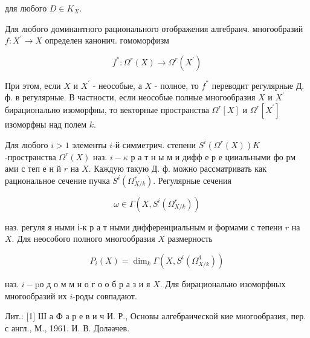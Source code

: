 \documentclass[10pt]{article}
\begin{document}
для любого $D \in K_{X}$.



Для любого доминантного рационального отображения алгебраич. многообразий $f: X^{\prime} \rightarrow X$ определен канонич. гомоморфизм



\[

f^{*}: \Omega^{r}(X) \longrightarrow \Omega^{r}\left(X^{\prime}\right)

\]



При этом, если $X$ и $X^{\prime}$ - неособые, а $X$ - полное, то $f^{*}$ переводит регулярные Д. ф. в регулярные. В частности, если неособые полные многообразия $X$ и $X^{\prime}$ бирационально изоморфны, то векторные пространства $\Omega^{r}[X]$ и $\Omega^{r}\left[X^{\prime}\right]$ изоморфны над полем $k$.



Для любого $i>1$ элементы $i$-й симметрич. степени $S^{i}\left(\Omega^{r}(X)\right) K$-пространства $\Omega^{r}(X)$ наз. $i-\kappa$ р а т н ы м и дифф е р е цииальными фо рм ами с теп е н й $r$ на $X$. Каждую такую Д. ф. можно рассматривать как рациональное сечение пучка $S^{i}\left(\Omega_{X / k}^{r}\right)$. Регулярные сечения



\[

\omega \in \Gamma\left(X, S^{i}\left(\Omega_{X / k}^{r}\right)\right)

\]



наз. регуля я ными $і$-к р а т ными дифференциальным и формами с тепени $r$ на $X$. Для неособого полного многообразия $X$ размерность



\[

P_{i}(X)=\operatorname{dim}_{k} \Gamma\left(X, S^{i}\left(\Omega_{X / k}^{d}\right)\right)

\]



наз. $i-\mathrm{p} о$ д о м м н о г о о б р а з и я $X$. Для бирационально изоморфных многообразий их $i$-роды совпадают.



Лит.: [1] Ш а Ф а р е в и ч И. Р., Основы алгебраической кие многообразия, пер. с англ., М., 1961. И. В. Доләачев.
\end{document}
